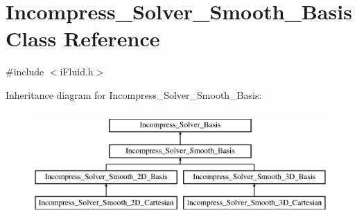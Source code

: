 \hypertarget{class_incompress___solver___smooth___basis}{}\section{Incompress\+\_\+\+Solver\+\_\+\+Smooth\+\_\+\+Basis Class Reference}
\label{class_incompress___solver___smooth___basis}


{\ttfamily \#include $<$i\+Fluid.\+h$>$}

Inheritance diagram for Incompress\+\_\+\+Solver\+\_\+\+Smooth\+\_\+\+Basis\+:\begin{figure}[H]
\begin{center}
\leavevmode
\includegraphics[height=4.000000cm]{d3/d30/class_incompress___solver___smooth___basis}
\end{center}
\end{figure}
